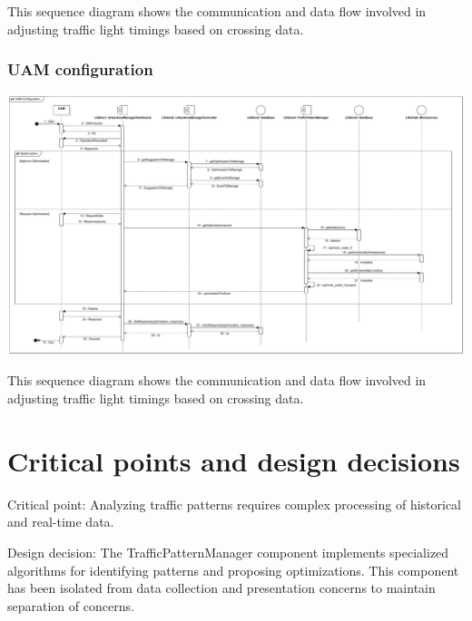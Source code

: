 \documentclass[12pt, a4paper, twoside, openright]{report}
\begin{document}
This sequence diagram shows the communication and data flow involved in
adjusting traffic light timings based on crossing data.


\subsubsection{UAM configuration}

\includegraphics[width=\linewidth]{images/svg/uam_configuration.pdf}

This sequence diagram shows the communication and data flow involved in
adjusting traffic light timings based on crossing data.


\section{Critical points and design decisions}
Critical point: Analyzing traffic patterns requires complex processing of
historical and real-time data.

Design decision: The TrafficPatternManager component implements specialized
algorithms for identifying patterns and proposing optimizations. This 
component has been isolated from data collection and presentation concerns 
to maintain separation of concerns.
\end{document}
